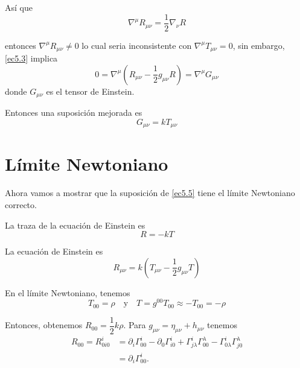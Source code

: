 \documentclass[../main]{subfiles}
\begin{document}
Así que 
\begin{equation}
    \nabla^{\mu} R_{\mu\nu}=\dfrac{1}{2}\nabla_{\nu}R
    \label{ec5.3}
\end{equation}
\begin{adjustwidth}{0pt}{-100pt}
entonces $\nabla^{\mu} R_{\mu\nu} \neq 0$ lo cual seria inconsistente con $\nabla^{\mu} T_{\mu\nu}=0$, sin embargo, \eqref{ec5.3} implica 
\begin{equation}
    0=\nabla^{\mu}\left(R_{\mu\nu}-\dfrac{1}{2}g_{\mu\nu}R\right)=\nabla^{\mu} G_{\mu\nu}
\end{equation}
donde $G_{\mu\nu}$ es el tensor de Einstein.

Entonces una suposición mejorada es 
\begin{equation}
    G_{\mu\nu}=kT_{\mu\nu}
    \label{ec5.5}
\end{equation}

\section{Límite Newtoniano}\label{part5.1}

Ahora vamos a mostrar que la suposición de \eqref{ec5.5} tiene el límite Newtoniano correcto.

La traza de la ecuación de Einstein es 
\begin{equation}
    R=-kT
\end{equation}

La ecuación de Einstein es 
\begin{equation}
    R_{\mu\nu}=k\left(T_{\mu\nu}-\dfrac{1}{2}g_{\mu\nu}T\right)
\end{equation}

En el límite Newtoniano, tenemos 
\begin{equation}
    T_{00}=\rho \quad \text{y} \quad T=g^{00}T_{00}\approx -T_{00}=-\rho
\end{equation}

Entonces, obtenemos $R_{00}=\dfrac{1}{2}k\rho$. Para $g_{\mu\nu}=\eta_{\mu\nu}+h_{\mu\nu}$ tenemos 
\begin{equation}
    \begin{split}
        R_{00}=R^{i}_{0i0}&=\partial_i \Gamma^{i}_{00}-\partial_0 \Gamma^{i}_{i0}+\Gamma^{i}_{j\lambda}\Gamma^{\lambda}_{00}-\Gamma^{i}_{0\lambda}\Gamma^{\lambda}_{j0}\\
        &=\partial_i \Gamma^{i}_{00}.
    \end{split}
\end{equation}


\end{adjustwidth}
\end{document}
